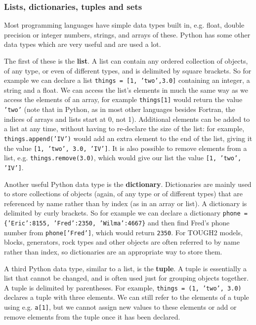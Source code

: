 \subsubsection{Lists, dictionaries, tuples and sets}

Most programming languages have simple data types built in, e.g. float, double precision or integer numbers, strings, and arrays of these.  Python has some other data types which are very useful and are used a lot.

The first of these is the \textbf{list}.  A list can contain any ordered collection of objects, of any type, or even of different types, and is delimited by square brackets.  So for example we can declare a list \texttt{things = [1, 'two',3.0]} containing an integer, a string and a float.  We can access the list's elements in much the same way as we access the elements of an array, for example \texttt{things[1]} would return the value \texttt{'two'} (note that in Python, as in most other languages besides Fortran, the indices of arrays and lists start at 0, not 1).  Additional elements can be added to a list at any time, without having to re-declare the size of the list: for example, \texttt{things.append('IV')} would add an extra element to the end of the list, giving it the value \texttt{[1, 'two', 3.0, 'IV']}.  It is also possible to remove elements from a list, e.g. \texttt{things.remove(3.0)}, which would give our list the value \texttt{[1, 'two', 'IV']}.

Another useful Python data type is the \textbf{dictionary}.  Dictionaries are mainly used to store collections of objects (again, of any type or of different types) that are referenced by name rather than by index (as in an array or list).  A dictionary is delimited by curly brackets.  So for example we can declare a dictionary \texttt{phone = \{'Eric':8155, 'Fred':2350, 'Wilma':4667\}} and then find Fred's phone number from \texttt{phone['Fred']}, which would return \texttt{2350}.  For TOUGH2 models, blocks, generators, rock types and other objects are often referred to by name rather than index, so dictionaries are an appropriate way to store them.

A third Python data type, similar to a list, is the \textbf{tuple}.  A tuple is essentially a list that cannot be changed, and is often used just for grouping objects together.  A tuple is delimited by parentheses.  For example, \texttt{things = (1, 'two', 3.0)} declares a tuple with three elements.  We can still refer to the elements of a tuple using e.g. \texttt{a[1]}, but we cannot assign new values to these elements or add or remove elements from the tuple once it has been declared.

